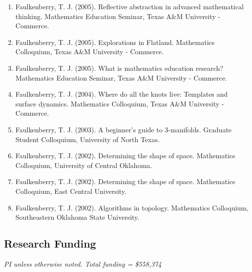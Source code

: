 \documentclass[article,10pt]{article}
\begin{document}
\begin{enumerate}
\item Faulkenberry, T. J. (2005). Reflective abstraction in advanced mathematical thinking. Mathematics Education Seminar, Texas A\&M University - Commerce.
\item Faulkenberry, T. J. (2005). Explorations in Flatland. Mathematics Colloquium, Texas A\&M University - Commerce.
\item Faulkenberry, T. J. (2005). What is mathematics education research? Mathematics Education Seminar, Texas A\&M University - Commerce.
\item Faulkenberry, T. J. (2004). Where do all the knots live: Templates and surface dynamics. Mathematics Colloquium, Texas A\&M University - Commerce.
\item Faulkenberry, T. J. (2003). A beginner’s guide to 3-manifolds. Graduate Student Colloquium, University of North Texas.
\item Faulkenberry, T. J. (2002). Determining the shape of space. Mathematics Colloquium, University of Central Oklahoma.
\item Faulkenberry, T. J. (2002). Determining the shape of space. Mathematics Colloquium, East Central University.
\item Faulkenberry, T. J. (2002). Algorithms in topology. Mathematics Colloquium, Southeastern Oklahoma State University.
\end{enumerate}

\subsection*{Research Funding}
\label{sec:org08bee5d}

\emph{PI unless otherwise noted.  Total funding = \$558,374}
\end{document}
